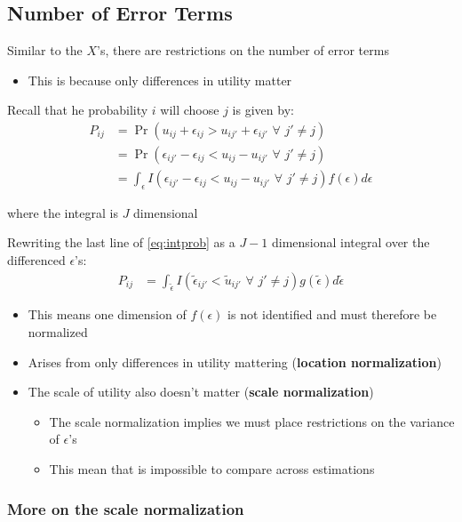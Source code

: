 \documentclass[11pt]{article}
\begin{document}
\subsection{Number of Error Terms}
\label{sec:org1a1cef2}

Similar to the \(X\)'s, there are restrictions on the number of error terms

\begin{itemize}
\item This is because only differences in utility matter
\end{itemize}

Recall that he probability \(i\) will choose \(j\) is given by:
\begin{align}
P_{ij}&=\Pr(u_{ij}+\epsilon_{ij}>u_{ij'}+\epsilon_{ij'}\,\,\forall\,\, j'\neq j)\nonumber\\
&=\Pr(\epsilon_{ij'}-\epsilon_{ij}<u_{ij}-u_{ij'}\,\,\forall\,\, j'\neq j)\label{eq:intprob}\\
&=\int_{\epsilon}I(\epsilon_{ij'}-\epsilon_{ij}<u_{ij}-u_{ij'}\,\,\forall\,\, j'\neq j)f(\epsilon)d\epsilon\nonumber
\end{align}

where the integral is \(J\) dimensional

Rewriting the last line of \eqref{eq:intprob} as a \(J-1\) dimensional integral over the differenced \(\epsilon\)'s:
\begin{align}
P_{ij}&=\int_{\tilde{\epsilon}}I(\tilde{\epsilon}_{ij'}<\tilde{u}_{ij'} \,\,\forall\,\, j'\neq j)g(\tilde{\epsilon})d\tilde{\epsilon}
\end{align}

\begin{itemize}
\item This means one dimension of \(f(\epsilon)\) is not identified and must therefore be normalized
\item Arises from only differences in utility mattering (\textbf{location normalization})
\item The scale of utility also doesn't matter (\textbf{scale normalization})
\begin{itemize}
\item The scale normalization implies we must place restrictions on the variance of \(\epsilon\)'s
\item This mean that is impossible to compare across estimations
\end{itemize}
\end{itemize}


\subsubsection{More on the scale normalization}
\label{sec:org9e32028}
\end{document}
